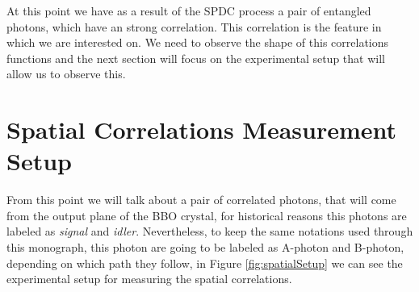 At this point we have as a result of the SPDC process a pair of entangled photons, which have an strong correlation. This correlation is 
the feature in which we are interested on. We need to observe the shape of this correlations functions and the next section will focus 
on the experimental setup that will allow us to observe this.



\section{Spatial Correlations Measurement Setup}\label{sec:pola}
From this point we will talk about a pair of correlated photons, that will come from the output plane of the BBO 
crystal, for historical reasons this photons are labeled as \textit{signal} and \textit{idler}. Nevertheless, to keep the same notations used through 
this monograph, this photon are going to be labeled as A-photon and B-photon, depending on which path they follow, in Figure \ref{fig:spatialSetup}
we can see the experimental setup for measuring the spatial correlations.

